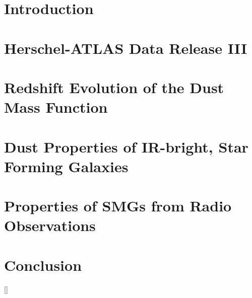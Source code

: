 \documentclass[a4paper,11pt,twoside,openany,dalthesis]{report}
\begin{document}
\chapter{Introduction}
\label{chapter:Introduction}


\chapter{Herschel-ATLAS Data Release III}
\label{chapter:Data_Release_3}


\chapter{Redshift Evolution of the Dust Mass Function}
\label{chapter:Dust_Mass_Functions}


\chapter{Dust Properties of IR-bright, Star Forming Galaxies}
\label{chapter:Dust_Evolution}


\chapter{Properties of SMGs from Radio Observations}
\label{chapter:Radio_Identifications}


\chapter{Conclusion}
\label{chapter:Conclusion}


\listoftodos

\appendix


[\titlerule\vspace{2pt}\titlerule]


\label{app:candidate_lenses_bright}


\label{app:HerBS_photometry}


\label{app:SPT_DSFG_photometry}
\end{document}
